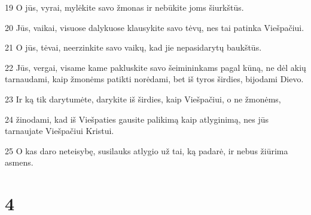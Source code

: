 \par 19 O jūs, vyrai, mylėkite savo žmonas ir nebūkite joms šiurkštūs. 
\par 20 Jūs, vaikai, visuose dalykuose klausykite savo tėvų, nes tai patinka Viešpačiui. 
\par 21 O jūs, tėvai, neerzinkite savo vaikų, kad jie nepasidarytų baukštūs. 
\par 22 Jūs, vergai, visame kame pakluskite savo šeimininkams pagal kūną, ne dėl akių tarnaudami, kaip žmonėms patikti norėdami, bet iš tyros širdies, bijodami Dievo. 
\par 23 Ir ką tik darytumėte, darykite iš širdies, kaip Viešpačiui, o ne žmonėms, 
\par 24 žinodami, kad iš Viešpaties gausite palikimą kaip atlyginimą,­ nes jūs tarnaujate Viešpačiui Kristui. 
\par 25 O kas daro neteisybę, susilauks atlygio už tai, ką padarė, ir nebus žiūrima asmens.


\chapter{4}



